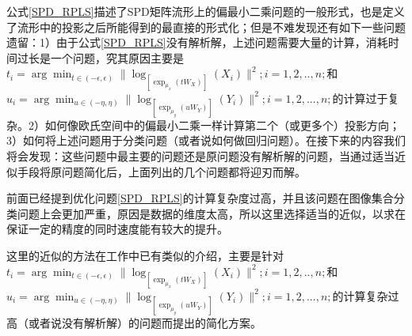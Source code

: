 公式\ref{SPD_RPLS}描述了SPD矩阵流形上的偏最小二乘问题的一般形式，也是定义了流形中的投影之后所能得到的最直接的形式化；但是不难发现还有如下一些问题遗留：1）由于公式\ref{SPD_RPLS}没有解析解，上述问题需要大量的计算，消耗时间过长是一个问题，究其原因主要是$t_i=\arg\min_{t \in (-\epsilon,\epsilon)}\|\log_{[\exp_{\mu_x}(tW_X)]}(X_i)\|^2;i=1,2,..,n;$和$u_i=\arg\min_{u \in (-\eta,\eta)}\|\log_{[\exp_{\mu_y}(uW_Y)]}(Y_i)\|^2;i=1,2,...,n;$的计算过于复杂。2）如何像欧氏空间中的偏最小二乘一样计算第二个（或更多个）投影方向；3）如何将上述问题用于分类问题（或者说如何做回归问题）。在接下来的内容我们将会发现：这些问题中最主要的问题还是原问题没有解析解的问题，当通过适当近似手段将原问题简化后，上面列出的几个问题都将迎刃而解。

前面已经提到优化问题\ref{SPD_RPLS}的计算复杂度过高，并且该问题在图像集合分类问题上会更加严重，原因是数据的维度太高，所以这里选择适当的近似，以求在保证一定的精度的同时速度能有较大的提升。

这里的近似的方法在工作\cite{RCCA,PGA}中已有类似的介绍，主要是针对$t_i=\arg\min_{t \in (-\epsilon,\epsilon)}\|\log_{[\exp_{\mu_x}(tW_X)]}(X_i)\|^2;i=1,2,..,n;$和$u_i=\arg\min_{u \in (-\eta,\eta)}\|\log_{[\exp_{\mu_y}(uW_Y)]}(Y_i)\|^2;i=1,2,...,n;$的计算复杂过高（或者说没有解析解）的问题而提出的简化方案。


